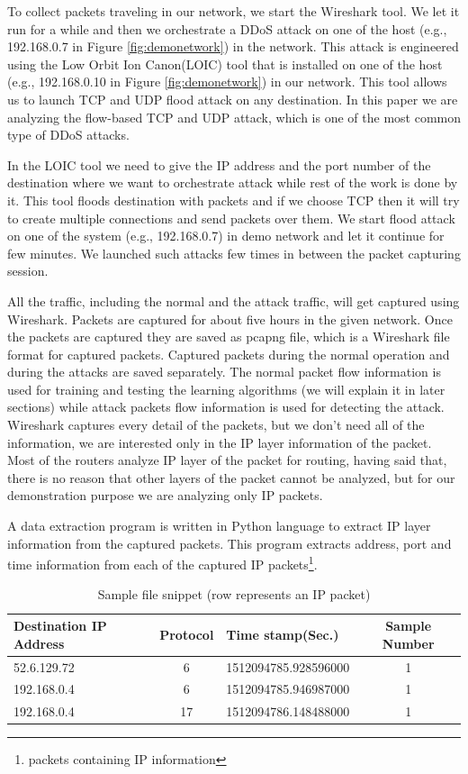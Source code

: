 \documentclass[12pt,oneside,a4paper]{article}
\begin{document}
To collect packets traveling in our network, we start the Wireshark tool. We let it run for a while and then we orchestrate a DDoS attack on one of the host (e.g., 192.168.0.7 in Figure \ref{fig:demonetwork}) in the network. This attack is engineered using the Low Orbit Ion Canon(LOIC) tool that is installed on one of the host (e.g., 192.168.0.10 in Figure \ref{fig:demonetwork}) in our network. This tool allows us to launch TCP and UDP flood attack on any destination. In this paper we are analyzing the flow-based TCP and UDP attack, which is one of the most common type of DDoS attacks.

In the LOIC tool we need to give the IP address and the port number of the destination where we want to orchestrate attack while rest of the work is done by it. This tool floods destination with packets and if we choose TCP then it will try to create multiple connections and send packets over them. We start flood attack on one of the system (e.g., 192.168.0.7) in demo network and let it continue for few minutes. We launched such attacks few times in between the packet capturing session.

All the traffic, including the normal and the attack traffic, will get captured using Wireshark. Packets are captured for about five hours in the given network. Once the packets are captured they are saved as pcapng file, which is a Wireshark file format for captured packets. Captured packets during the normal operation and during the attacks are saved separately. The normal packet flow information is used for training and testing the learning algorithms (we will explain it in later sections) while attack packets flow information is used for detecting the attack. Wireshark captures every detail of the packets, but we don't need all of the information, we are interested only in the IP layer information of the packet. Most of the routers analyze IP layer of the packet for routing, having said that, there is no reason that other layers of the packet cannot be analyzed, but for our demonstration purpose we are analyzing only IP packets.\par

A data extraction program is written in Python language to extract IP layer information from the captured packets. This program extracts address, port and time information from each of the captured IP packets\footnote{packets containing IP information}.

\begin{table}[H]
\centering
  \begin{tabular}{| l | c | l | c |}
    \hline
    Destination IP Address      & Protocol  & Time stamp(Sec.)  & Sample Number \\
    \hline
    52.6.129.72         & 6         & 1512094785.928596000  & 1 \\ \hline
    192.168.0.4         & 6         & 1512094785.946987000  & 1 \\ \hline
    192.168.0.4         & 17        & 1512094786.148488000  & 1 \\ \hline
  \end{tabular}
\caption{Sample file snippet (row represents an IP packet)} \label{table:sample-file-snippet}
\end{table}
\end{document}
